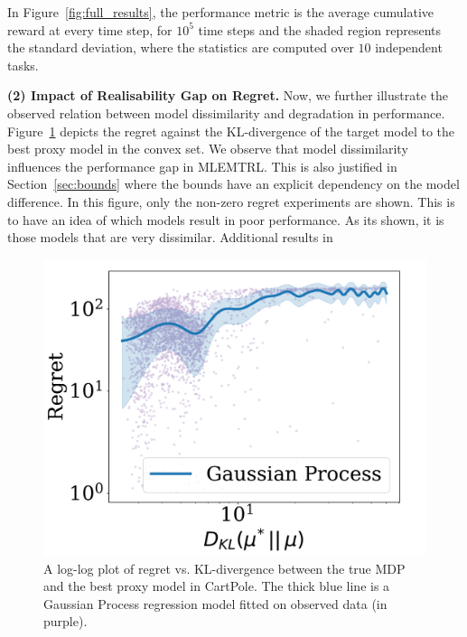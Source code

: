 In Figure~\ref{fig:full_results}, the performance metric is the average cumulative reward at every time step, for $10^5$ time steps and the shaded region represents the standard deviation, where the statistics are computed over $10$ independent tasks. %


\noindent\textbf{(2) Impact of Realisability Gap on Regret.} Now, we further illustrate the observed relation between model dissimilarity and degradation in performance. Figure~\ref{fig:norms} depicts the regret against the KL-divergence of the target model to the best proxy model in the convex set. We observe that model dissimilarity influences the performance gap in MLEMTRL. This is also justified in Section~\ref{sec:bounds} where the bounds have an explicit dependency on the model difference. In this figure, only the non-zero regret experiments are shown. This is to have an idea of which models result in poor performance. As its shown, it is those models that are very dissimilar. Additional results in %


\begin{figure}[h]
    \centering
    \includegraphics[width=.5\textwidth]{img/alpha_norms}
    \caption{A log-log plot of regret vs. KL-divergence between the true MDP and the best proxy model in CartPole. The thick blue line is a Gaussian Process regression model fitted on observed data (in purple).}
    \label{fig:norms}
\end{figure}

